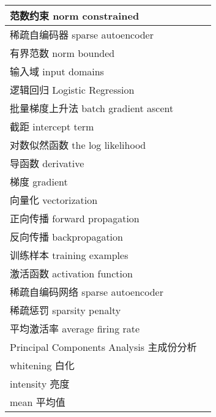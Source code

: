 \begin{longtable}[h]{m{}m{}}
范数约束 norm constrained \\
  \midrule

稀疏自编码器 sparse autoencoder \\
  \midrule

有界范数 norm bounded \\
  \midrule

输入域 input domains \\
  \midrule

逻辑回归 Logistic Regression \\
  \midrule

批量梯度上升法 batch gradient ascent \\
  \midrule

截距 intercept term \\
  \midrule

对数似然函数 the log likelihood \\
  \midrule

导函数 derivative \\
  \midrule

梯度 gradient \\
  \midrule

向量化 vectorization \\
  \midrule

正向传播 forward propagation \\
  \midrule

反向传播 backpropagation \\
  \midrule

训练样本 training examples \\
  \midrule

激活函数 activation function \\
  \midrule

稀疏自编码网络 sparse autoencoder \\
  \midrule

稀疏惩罚 sparsity penalty \\
  \midrule

平均激活率 average firing rate \\
  \midrule

Principal Components Analysis 主成份分析 \\
  \midrule

whitening 白化 \\
  \midrule

intensity 亮度 \\
  \midrule

mean 平均值 \\
  \midrule


\end{longtable}
